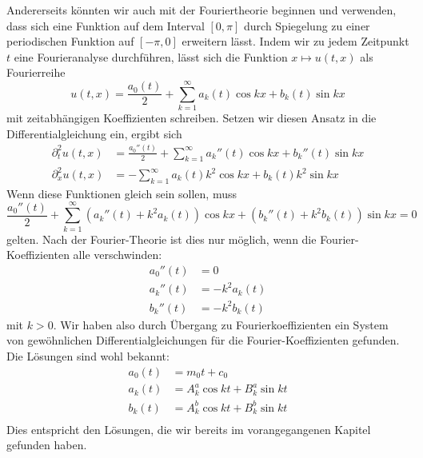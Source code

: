 Andererseits könnten wir auch mit der Fouriertheorie beginnen und
verwenden, dass sich eine Funktion auf dem Interval $[0,\pi]$
durch Spiegelung zu einer periodischen Funktion auf $[-\pi,0]$
erweitern lässt. Indem wir zu jedem Zeitpunkt $t$ eine Fourieranalyse
durchführen, lässt sich die Funktion $x\mapsto u(t,x)$ als
Fourierreihe 
\[
u(t,x)=\frac{a_0(t)}2+\sum_{k=1}^\infty a_k(t)\cos kx+b_k(t)\sin kx
\]
mit zeitabhängigen Koeffizienten schreiben.
Setzen wir diesen Ansatz in die Differentialgleichung ein, ergibt sich
\begin{align*}
\partial_t^2u(t,x)&=\frac{a_0''(t)}2
+\sum_{k=1}^\infty a_k''(t)\cos kx+b_k''(t)\sin kx\\
\partial_x^2u(t,x)&=
-\sum_{k=1}^\infty a_k(t)k^2\cos kx+b_k(t)k^2\sin kx
\end{align*}
Wenn diese Funktionen gleich sein sollen, muss
\[
\frac{a_0''(t)}2
+\sum_{k=1}^\infty (a_k''(t)+k^2a_k(t))\cos kx+(b_k''(t)+k^2b_k(t))\sin kx=0
\]
gelten. Nach der Fourier-Theorie ist dies nur möglich, wenn die
Fourier-Koeffizienten alle verschwinden:
\begin{align*}
a_0''(t)&=0\\
a_k''(t)&=-k^2a_k(t)\\
b_k''(t)&=-k^2b_k(t)
\end{align*}
mit $k>0$.
Wir haben also durch Übergang zu Fourierkoeffizienten ein System
von gewöhnlichen Differentialgleichungen für die Fourier-Koeffizienten
gefunden. Die Lösungen sind wohl bekannt:
\begin{align*}
a_0(t)&=m_0t+c_0\\
a_k(t)&=A^a_k\cos kt+B^a_k\sin kt\\
b_k(t)&=A^b_k\cos kt+B^b_k\sin kt\\
\end{align*}
Dies entspricht den Lösungen, die wir bereits im vorangegangenen
Kapitel gefunden haben.

